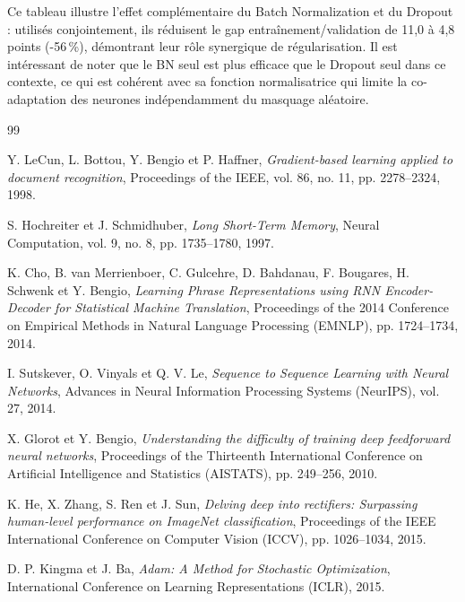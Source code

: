 \documentclass[11pt,a4paper]{article}
\begin{document}
Ce tableau illustre l'effet complémentaire du Batch Normalization et du Dropout :
utilisés conjointement, ils réduisent le gap entraînement/validation de 11,0 à 4,8 points
(-56\,\%), démontrant leur rôle synergique de régularisation. Il est intéressant de noter
que le BN seul est plus efficace que le Dropout seul dans ce contexte, ce qui est cohérent
avec sa fonction normalisatrice qui limite la co-adaptation des neurones indépendamment
du masquage aléatoire.

\newpage
{}

\begin{thebibliography}{99}

Y. LeCun, L. Bottou, Y. Bengio et P. Haffner,
\textit{Gradient-based learning applied to document recognition},
Proceedings of the IEEE, vol. 86, no. 11, pp. 2278--2324, 1998.

S. Hochreiter et J. Schmidhuber,
\textit{Long Short-Term Memory},
Neural Computation, vol. 9, no. 8, pp. 1735--1780, 1997.

K. Cho, B. van Merrienboer, C. Gulcehre, D. Bahdanau, F. Bougares, H. Schwenk et Y. Bengio,
\textit{Learning Phrase Representations using RNN Encoder-Decoder for Statistical Machine Translation},
Proceedings of the 2014 Conference on Empirical Methods in Natural Language Processing
(EMNLP), pp. 1724--1734, 2014.

I. Sutskever, O. Vinyals et Q. V. Le,
\textit{Sequence to Sequence Learning with Neural Networks},
Advances in Neural Information Processing Systems (NeurIPS), vol. 27, 2014.

X. Glorot et Y. Bengio,
\textit{Understanding the difficulty of training deep feedforward neural networks},
Proceedings of the Thirteenth International Conference on Artificial Intelligence
and Statistics (AISTATS), pp. 249--256, 2010.

K. He, X. Zhang, S. Ren et J. Sun,
\textit{Delving deep into rectifiers: Surpassing human-level performance on ImageNet
classification},
Proceedings of the IEEE International Conference on Computer Vision (ICCV),
pp. 1026--1034, 2015.

D. P. Kingma et J. Ba,
\textit{Adam: A Method for Stochastic Optimization},
International Conference on Learning Representations (ICLR), 2015.


\end{thebibliography}
\end{document}
